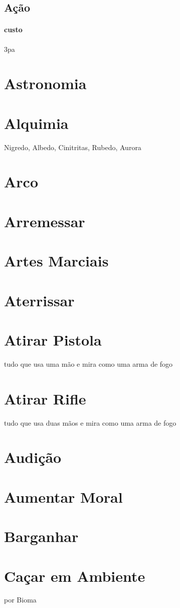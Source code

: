 \subsection{Ação}
\paragraph{custo} 3pa

\section{Astronomia}
\section{Alquimia} Nigredo, Albedo, Cinitritas, Rubedo, Aurora
\section{Arco}
\section{Arremessar}
\section{Artes Marciais}
\section{Aterrissar}
\section{Atirar Pistola} tudo que usa uma mão e mira como uma arma de fogo
\section{Atirar Rifle} tudo que usa duas mãos e mira como uma arma de fogo
\section{Audição}
\section{Aumentar Moral}
\section{Barganhar}
\section{Caçar em Ambiente} por Bioma
